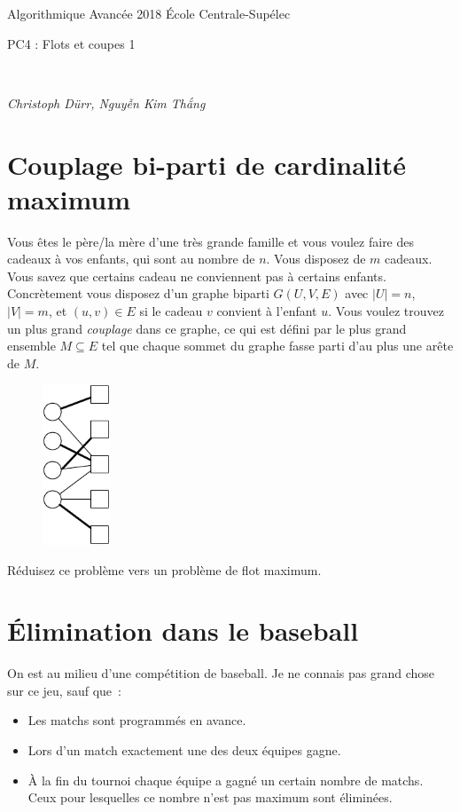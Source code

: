 \documentclass[12pt]{article}
\newcommand{\MakeScribeTop}[1]{
\noindent
\begin{framed}
\noindent
 Algorithmique Avancée 2018
 \hfill
 École Centrale-Supélec
 \\[1em]
 \centerline{ \Large
#1
 }
 \\[1em]
\centerline{  \it Christoph Dürr, Nguyễn Kim Thắng}
\end{framed}
}
\begin{document}
    \MakeScribeTop{PC4 : Flots et coupes 1}

\section{Couplage bi-parti de cardinalité maximum}

Vous êtes le père/la mère d'une très grande famille et vous voulez faire des cadeaux à vos enfants, qui sont au nombre de $n$.  Vous disposez de $m$ cadeaux.  Vous savez que certains cadeau ne conviennent pas à certains enfants. Concrètement vous disposez d'un graphe biparti $G(U,V,E)$ avec $|U|=n$, $|V|=m$, et $(u,v)\in E$ si le cadeau $v$ convient à l'enfant $u$.  Vous voulez trouvez un plus grand \emph{couplage} dans ce graphe, ce qui est défini par le plus grand ensemble $M\subseteq E$ tel que chaque sommet du graphe fasse parti d'au plus une arête de $M$. 


\begin{figure}[h]
	\centerline{\includegraphics[width=2cm]{couplage.pdf}}
\end{figure}


Réduisez ce problème vers un problème de flot maximum.


\section{Élimination dans le baseball}


On est au milieu d'une compétition de baseball.
Je ne connais pas grand chose sur ce jeu, sauf que~:
\begin{itemize}
	\item Les matchs sont programmés en avance.
	\item Lors d'un match exactement une des deux équipes gagne.
	\item À la fin du tournoi chaque équipe a gagné un certain nombre de matchs. Ceux pour lesquelles ce nombre n'est pas maximum sont éliminées.
\end{itemize}
\end{document}
